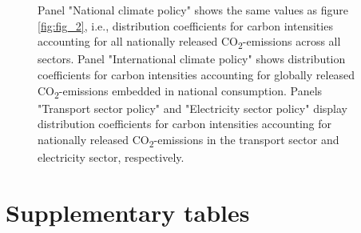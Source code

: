 \documentclass[12pt, a4paper]{article}
\newenvironment{subcaption2}
{\strut
\vspace{-5pt}
\begin{minipage}[b]{0.95\textwidth}
  \hspace*{-\parindent}
  \footnotesize}
 {\end{minipage}}
\begin{document}
\begin{refsection}
\begin{figure}[ht!]
\begin{subcaption2}
    Panel "National climate policy" shows the same values as figure \ref{fig:fig_2}, i.e., distribution coefficients for carbon intensities accounting for all nationally released CO\textsubscript{2}-emissions across all sectors. Panel "International climate policy" shows distribution coefficients for carbon intensities accounting for globally released CO\textsubscript{2}-emissions embedded in national consumption. Panels "Transport sector policy" and "Electricity sector policy" display distribution coefficients for carbon intensities accounting for nationally released CO\textsubscript{2}-emissions in the transport sector and electricity sector, respectively.
    \end{subcaption2}
\end{figure}


\clearpage

\section{Supplementary tables} \label{sec:tables}


\clearpage


\clearpage


\clearpage


\clearpage


\clearpage


\clearpage

%   



\clearpage


\end{refsection}
\end{document}
